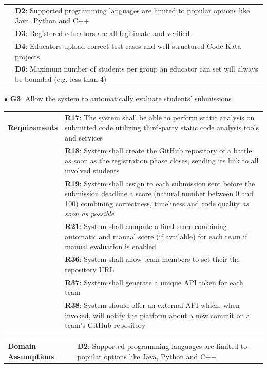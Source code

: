 \begin{center}
\begin{tabular}{ |m{3cm}|m{10cm}| }
        & \textbf{D2}: Supported programming languages are limited to popular options like Java, Python and C++ \\
        & \textbf{D3}: Registered educators are all legitimate and verified \\
        & \textbf{D4}: Educators upload correct test cases and well-structured Code Kata projects \\
        & \textbf{D6}: Maximum number of students per group an educator can set will always be bounded (e.g. less than 4) \\
        \hline
    \end{tabular}
\end{center}        
$\bullet$ \textbf{G3}: Allow the system to automatically evaluate students' submissions
\begin{center}
    \begin{tabular}{ |m{3cm}|m{10cm}| }
        \hline
        \textbf{Requirements} 
        & \textbf{R17}: The system shall be able to perform static analysis on submitted code utilizing third-party static code analysis tools and services \\
        & \textbf{R18}: System shall create the GitHub repository of a battle as soon as the registration phase closes, sending its link to all involved students \\
        & \textbf{R19}: System shall assign to each submission sent before the submission deadline a score (natural number between 0 and 100) combining correctness, timeliness and code quality \textit{as soon as possible} \\
        & \textbf{R21}: System shall compute a final score combining automatic and manual score (if available) for each team if manual evaluation is enabled \\
        & \textbf{R36}: System shall allow team members to set their the repository URL \\
        & \textbf{R37}: System shall generate a unique API token for each team \\
        & \textbf{R38}: System should offer an external API which, when invoked, will notify the platform about a new commit on a team’s GitHub repository \\
        \hline
    \end{tabular}
    \begin{tabular}{ |m{3cm}|m{10cm}| }
        \hline
        \textbf{Domain \newline Assumptions} 
        & \textbf{D2}: Supported programming languages are limited to popular options like Java, Python and C++ \\

\end{tabular}
\end{center}
